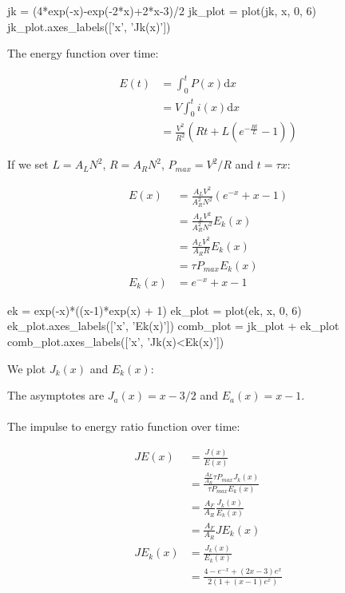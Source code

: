 \documentclass[]{../common/elementary-physics}
\begin{document}
\begin{sagesilent}
jk = (4*exp(-x)-exp(-2*x)+2*x-3)/2
jk_plot = plot(jk, x, 0, 6)
jk_plot.axes_labels(['x', 'Jk(x)'])
\end{sagesilent}

The energy function over time:

\begin{subequations}
\begin{align}
E(t) &= \int^t_0 P(x) \mathrm{d}x \\
&= V \int^t_0 i(x) \mathrm{d}x \\
&= \frac{V^2}{R^2} (R t + L(e^{-\frac{R t}{L}} - 1))
\end{align}
\end{subequations}

If we set $L = A_L N^2$, $R = A_R N^2$, $P_{max} = V^2 / R$ and  $t = \tau x$:

\begin{subequations}
\begin{align}
E(x) &= \frac{A_L V^2}{A_R^2 N^2} (e^{-x}+x-1) \\
&= \frac{A_L V^2}{A_R^2 N^2} E_k(x) \\
&= \frac{A_L V^2}{A_R R} E_k(x) \\
&= \tau P_{max} E_k(x) \\
E_k(x) &= e^{-x}+x-1
\end{align}
\end{subequations}

\begin{sagesilent}
ek = exp(-x)*((x-1)*exp(x) + 1)
ek_plot = plot(ek, x, 0, 6)
ek_plot.axes_labels(['x', 'Ek(x)'])
comb_plot = jk_plot + ek_plot
comb_plot.axes_labels(['x', 'Jk(x)<Ek(x)'])
\end{sagesilent}

We plot $J_k(x)$ and $E_k(x)$:


The asymptotes are $J_a(x) = x-3/2$ and $E_a(x) = x - 1$.\\
\\
The impulse to energy ratio function over time:

\begin{subequations}
\begin{align}
JE(x) &= \frac{J(x)}{E(x)} \\
&= \frac{\frac{A_F}{A_R} \tau P_{max} J_k(x)}{\tau P_{max} E_k(x)} \\
&= \frac{A_F}{A_R} \frac{J_k(x)}{E_k(x)} \\
&= \frac{A_F}{A_R} JE_k(x) \\
JE_k(x) &= \frac{J_k(x)}{E_k(x)} \\
&= \frac{4-e^{-x}+(2x-3)e^x}{2(1+(x-1)e^x)}
\end{align}
\end{subequations}
\end{document}
